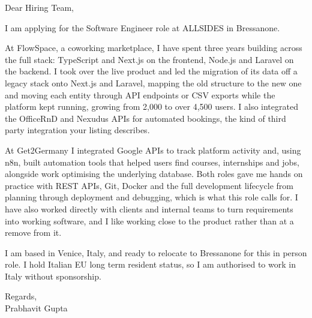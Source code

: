 \documentclass[a4paper,11pt]{article}
\begin{document}
Dear Hiring Team,

I am applying for the Software Engineer role at ALLSIDES in Bressanone.

At FlowSpace, a coworking marketplace, I have spent three years building across the full stack: TypeScript and Next.js on the frontend, Node.js and Laravel on the backend. I took over the live product and led the migration of its data off a legacy stack onto Next.js and Laravel, mapping the old structure to the new one and moving each entity through API endpoints or CSV exports while the platform kept running, growing from 2,000 to over 4,500 users. I also integrated the OfficeRnD and Nexudus APIs for automated bookings, the kind of third party integration your listing describes.

At Get2Germany I integrated Google APIs to track platform activity and, using n8n, built automation tools that helped users find courses, internships and jobs, alongside work optimising the underlying database. Both roles gave me hands on practice with REST APIs, Git, Docker and the full development lifecycle from planning through deployment and debugging, which is what this role calls for. I have also worked directly with clients and internal teams to turn requirements into working software, and I like working close to the product rather than at a remove from it.

I am based in Venice, Italy, and ready to relocate to Bressanone for this in person role. I hold Italian EU long term resident status, so I am authorised to work in Italy without sponsorship.

Regards,\\
Prabhavit Gupta
\end{document}
